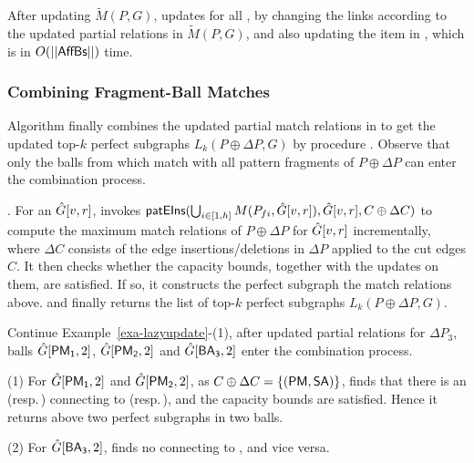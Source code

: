 \vspace{0.5ex}
 After updating $\tilde{M}(P,G)$,
\incp updates \fb for all \affballsx, by changing the links according to the updated partial relations in $\tilde{M}(P,G)$, and also updating the  item in \bs, which is in $O(||{\mathsf{AffBs}}||)$ time.


\subsubsection{Combining Fragment-Ball Matches}
\label{subsubsec-combine}

Algorithm \incp finally combines the updated partial match relations in \affballsx to get the updated top-$k$ perfect subgraphs $L_{k}(P\oplus \Delta P,G)$ by procedure \comb. Observe that only the balls from \affballsx which match with all pattern fragments of $P\oplus \Delta P$ can enter the combination process.



. For an \affballx $\hat{G}{[v,r]}$, \comb invokes ${\mathsf{patEIns}}(\bigcup_{i\in [1, h]}M(P_{fi},\hat{G}{[v,r]}), \hat{G}{[v,r]}, C\oplus \Delta C)$
to compute the maximum match relations of $P\oplus \Delta P$ for $\hat{G}{[v,r]}$ incrementally,
where $\Delta C$ consists of the edge insertions/deletions in $\Delta P$ applied to the cut edges $C$.
It then checks whether the capacity bounds, together with the updates on them, are satisfied.
If so, it constructs the perfect subgraph \wrt the match relations above.
 and finally returns the list of top-$k$ perfect subgraphs $L_{k}(P\oplus \Delta P,G)$.



\begin{example}
\label{exa-combination}
Continue Example~\ref{exa-lazyupdate}-(1), after \incp updated partial relations for \affballsx \wrt $\Delta P_3$,
balls $\hat{G}{[{\mathsf{PM_1}},2]}$, $\hat{G}{[{\mathsf{PM_2}},2]}$ and $\hat{G}{[{\mathsf{BA_3}},2]}$ enter the combination process.

\sstab
(1) For $\hat{G}{[{\mathsf{PM_1}},2]}$ and $\hat{G}{[{\mathsf{PM_2}},2]}$, as $C\oplus \Delta C=\{({\mathsf{PM}},{\mathsf{SA}})\}$,
\comb finds that there is an  (resp.\,) connecting to  (resp.\,),
and the capacity bounds are satisfied.
Hence it returns above two perfect subgraphs in two balls.

\sstab
(2) For $\hat{G}{[{\mathsf{BA_3}},2]}$, \comb finds no  connecting to , and vice versa.
\end{example}



